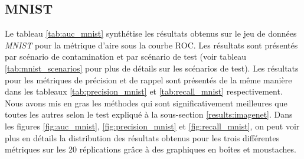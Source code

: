 \subsection{MNIST}

Le tableau \ref{tab:auc_mnist} synthétise les résultats obtenus sur le jeu de données \textit{MNIST} pour la métrique d'aire sous la courbe ROC. Les résultats sont présentés par scénario de contamination et par scénario de test (voir tableau \ref{tab:mnist_scenarios} pour plus de détails sur les scénarios de test). Les résultats pour les métriques de précision et de rappel sont présentés de la même manière dans les tableaux \ref{tab:precision_mnist} et \ref{tab:recall_mnist} respectivement. Nous avons mis en gras les méthodes qui sont significativement meilleures que toutes les autres selon le test expliqué à la sous-section \ref{results:imagenet}. Dans les figures \ref{fig:auc_mnist}, \ref{fig:precision_mnist} et \ref{fig:recall_mnist}, on peut voir plus en détails la distribution des résultats obtenus pour les trois différentes métriques sur les 20 réplications grâce à des graphiques en boîtes et moustaches.

